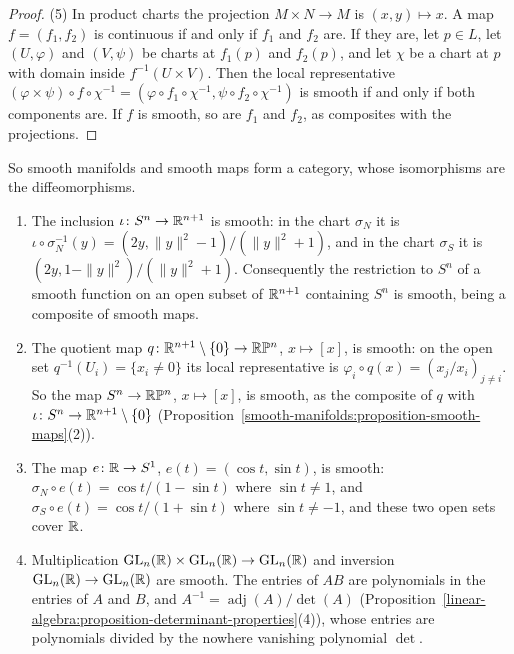 \begin{proof}
(5) In product charts the projection $M \times N \to M$ is $(x, y) \mapsto x$. A map $f = (f_1, f_2)$ is continuous if and only if $f_1$ and $f_2$ are. If they
are, let $p \in L$, let $(U, \varphi)$ and $(V, \psi)$ be charts at $f_1(p)$ and $f_2(p)$, and let $\chi$ be a chart at $p$ with domain inside
$f^{-1}(U \times V)$. Then the local representative $(\varphi \times \psi) \circ f \circ \chi^{-1} = (\varphi \circ f_1 \circ \chi^{-1}, \psi \circ f_2 \circ \chi^{-1})$ is smooth if and
only if both components are. If $f$ is smooth, so are $f_1$ and $f_2$, as composites with the projections.
\end{proof}

So smooth manifolds and smooth maps form a category, whose isomorphisms are the diffeomorphisms.

\begin{example}\label{smooth-manifolds:example-smooth-maps}
\begin{enumerate}
\item The inclusion $\iota \colon S^n \to \mathbb{R}^{n+1}$ is smooth: in the chart $\sigma_N$ it is
$\iota \circ \sigma_N^{-1}(y) = (2y, \|y\|^2 - 1)/(\|y\|^2 + 1)$, and in the chart $\sigma_S$ it is $(2y, 1 - \|y\|^2)/(\|y\|^2 + 1)$. Consequently the
restriction to $S^n$ of a smooth function on an open subset of $\mathbb{R}^{n+1}$ containing $S^n$ is smooth, being a composite of smooth maps.
\item The quotient map $q \colon \mathbb{R}^{n+1} \setminus \{0\} \to \mathbb{R}\mathbb{P}^n$, $x \mapsto [x]$, is smooth: on the open set $q^{-1}(U_i) = \{x_i \neq 0\}$ its local
representative is $\varphi_i \circ q(x) = (x_j/x_i)_{j \neq i}$. So the map $S^n \to \mathbb{R}\mathbb{P}^n$, $x \mapsto [x]$, is smooth, as the composite of $q$ with
$\iota \colon S^n \to \mathbb{R}^{n+1} \setminus \{0\}$ (Proposition~\ref{smooth-manifolds:proposition-smooth-maps}(2)).
\item The map $e \colon \mathbb{R} \to S^1$, $e(t) = (\cos t, \sin t)$, is smooth: $\sigma_N \circ e(t) = \cos t/(1 - \sin t)$ where $\sin t \neq 1$, and
$\sigma_S \circ e(t) = \cos t/(1 + \sin t)$ where $\sin t \neq -1$, and these two open sets cover $\mathbb{R}$.
\item Multiplication $\mathrm{GL}_n(\mathbb{R}) \times \mathrm{GL}_n(\mathbb{R}) \to \mathrm{GL}_n(\mathbb{R})$ and inversion $\mathrm{GL}_n(\mathbb{R}) \to \mathrm{GL}_n(\mathbb{R})$ are smooth. The entries of $AB$ are polynomials in
the entries of $A$ and $B$, and $A^{-1} = \operatorname{adj}(A)/\det(A)$ (Proposition~\ref{linear-algebra:proposition-determinant-properties}(4)), whose entries
are polynomials divided by the nowhere vanishing polynomial $\det$.
\end{enumerate}
\end{example}

